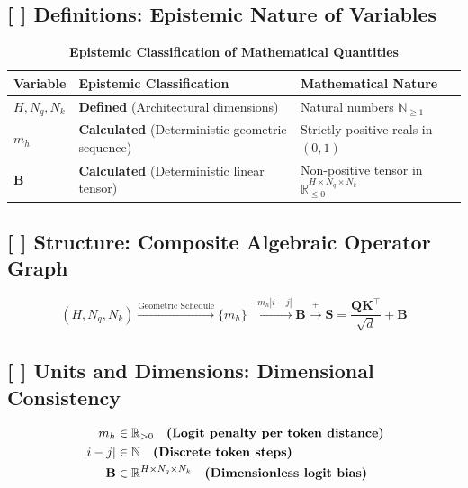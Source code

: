 \documentclass[11pt,a4paper]{article}
\theoremstyle{definition}
\begin{document}
\subsection{[ ] Definitions: Epistemic Nature of Variables}
\begin{table}[h]
\centering
\caption{\textbf{Epistemic Classification of Mathematical Quantities}}
\begin{tabular}{lll}
\toprule
\textbf{Variable} & \textbf{Epistemic Classification} & \textbf{Mathematical Nature} \\
\midrule
$H, N_q, N_k$ & \textbf{Defined} (Architectural dimensions) & Natural numbers $\mathbb{N}_{\ge 1}$ \\
$m_h$ & \textbf{Calculated} (Deterministic geometric sequence) & Strictly positive reals in $(0, 1)$ \\
$\mathbf{B}$ & \textbf{Calculated} (Deterministic linear tensor) & Non-positive tensor in $\mathbb{R}_{\le 0}^{H \times N_q \times N_k}$ \\
\bottomrule
\end{tabular}
\end{table}

\subsection{[ ] Structure: Composite Algebraic Operator Graph}
{\boldmath
\begin{equation}
(H, N_q, N_k) \xrightarrow{\text{Geometric Schedule}} \{m_h\} \xrightarrow{-m_h |i - j|} \mathbf{B} \xrightarrow{+} \mathbf{S} = \frac{\mathbf{Q}\mathbf{K}^\top}{\sqrt{d}} + \mathbf{B}
\end{equation}
}

\subsection{[ ] Units and Dimensions: Dimensional Consistency}
{\boldmath
\begin{align}
m_h &\in \mathbb{R}_{> 0} \quad \text{\textbf{(Logit penalty per token distance)}} \\
|i - j| &\in \mathbb{N} \quad \text{\textbf{(Discrete token steps)}} \\
\mathbf{B} &\in \mathbb{R}^{H \times N_q \times N_k} \quad \text{\textbf{(Dimensionless logit bias)}}
\end{align}
}
\end{document}
